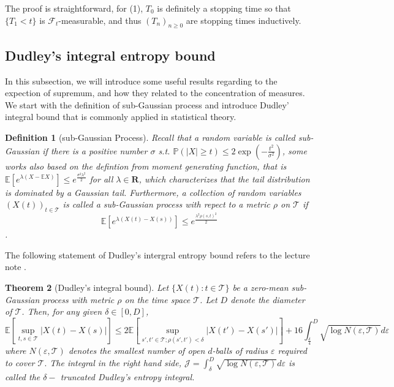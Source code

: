 \documentclass[11pt,english]{smfart}
\newtheorem{theorem}{Theorem}[subsection]
\newtheorem{definition}[theorem]{Definition}
\newcommand{\mb}{\mathbb}
\newcommand{\mf}{\mathbf}
\begin{document}
The proof is straightforward, for (1), $T_0$ is definitely a stopping time so that $\{T_1<t\}$ is $\mathcal{F}_t$-measurable, and thus $(T_n)_{n\geq 0}$ are stopping times inductively. 


\subsection{Dudley's integral entropy bound}
In this subsection, we will introduce some useful results regarding to the expection of supremum, and how they related to the concentration of measures. We start with the definition of sub-Gaussian process and introduce Dudley' integral bound that is commonly applied in statistical theory. \\

\begin{definition}[sub-Gaussian Process]
    Recall that a random variable is called sub-Gaussian if there is a positive number $\sigma $ s.t. $\displaystyle{\mb{P}(|X| \geq t) \leq 2\exp\left(-\frac{t^2}{\sigma^2}\right)}$, some works also based on the defintion from moment generating function, that is $ \mb{E}\left[e^{\lambda(X-\mb{E}X)}\right] \leq e^{\frac{\sigma^2\lambda^2}{2}}$ for all $\lambda \in \mf{R}$, which characterizes that the tail distribution is dominated by a Gaussian tail. Furthermore, a collection of random variables $(X(t))_{t\in \mathcal{T}}$ is called a sub-Gaussian process with repect to a metric $\rho$ on $\mathcal{T}$ if $$\mb{E}\left[e^{\lambda(X(t)- X(s))}\right] \leq e^{\frac{\lambda^2 \rho(s,t)^2}{2}}$$.
\end{definition}

The following statement of Dudley's intergral entropy bound refers to the lecture note \cite{UCB-Dudley}. 
\begin{theorem}[Dudley's integral bound]
    Let $\{X(t): t\in \mathcal{T}\}$ be a zero-mean sub-Gaussian process
    with metric $\rho$ on the time space $\mathcal{T}$. Let $D$ denote the diameter of $\mathcal{T}$. Then, for any given $\delta \in [0,D]$, $$\mb{E}\left[\sup_{t,s \in \mathcal{T}}|X(t) - X(s)|\right]\leq 2\mb{E}\left[\sup_{s',t'\in \mathcal{T}; \rho(s',t')<\delta} |X(t')-X(s')|\right] + 16\int_{\frac{\delta}{4}}^{D}\sqrt{\log N(\varepsilon,\mathcal{T})}d\varepsilon$$
    where $N(\varepsilon,\mathcal{T})$ denotes the smallest number of open $d$-balls of radius $\varepsilon$ required to cover $\mathcal{T}.$ The integral in the right hand side, $\displaystyle{\mathcal{J} = \int_\delta^D \sqrt{\log N(\varepsilon,\mathcal{T})}d\varepsilon}$ is called the $\delta-$ truncated Dudley's entropy integral.
\end{theorem}
\end{document}
